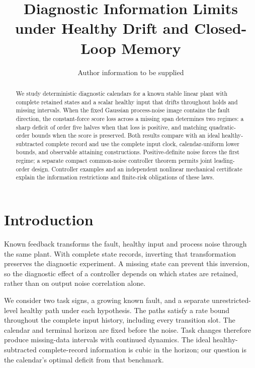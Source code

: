 \documentclass[journal]{IEEEtran}
\title{Diagnostic Information Limits under Healthy Drift and Closed-Loop Memory}
\author{Author information to be supplied}
\begin{document}
\maketitle
\begin{abstract}
We study deterministic diagnostic calendars for a known stable linear plant
with complete retained states and a scalar healthy input that drifts throughout
holds and missing intervals. When the fixed Gaussian process-noise image
contains the fault direction, the constant-force score loss across a missing
span determines two regimes: a sharp deficit of order five halves when that loss
is positive, and matching quadratic-order bounds when the score is preserved.
Both results compare with an ideal healthy-subtracted complete record and use
the complete input clock, calendar-uniform lower bounds, and observable
attaining constructions. Positive-definite noise forces the first regime;
a separate compact common-noise controller theorem permits joint leading-order
design. Controller examples and an independent nonlinear mechanical certificate
explain the information restrictions and finite-risk obligations of these laws.
\end{abstract}

\section{Introduction}\label{sf:introduction}
Known feedback transforms the fault, healthy input and process noise through
the same plant. With complete state records, inverting that transformation
preserves the diagnostic experiment. A missing state can prevent this inversion,
so the diagnostic effect of a controller depends on which states are retained,
rather than on output noise correlation alone.

We consider two task signs, a growing known fault, and a separate unrestricted-level
healthy path under each hypothesis. The paths satisfy a rate bound throughout
the complete input history, including every transition slot. The calendar and
terminal horizon are fixed before the noise. Task changes therefore produce
missing-data intervals with continued dynamics. The ideal healthy-subtracted
complete-record information is cubic in the horizon; our question is the
calendar's optimal deficit from that benchmark.
\end{document}
